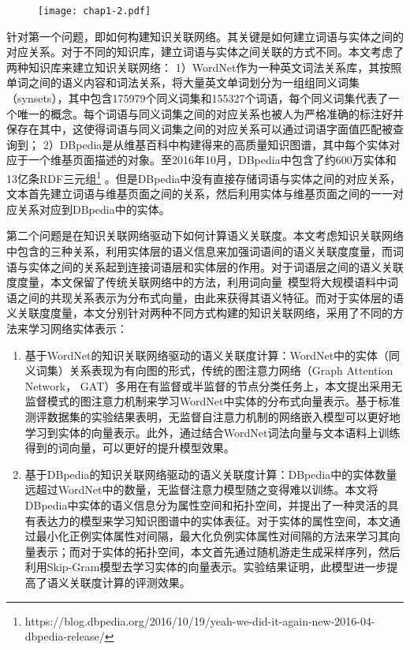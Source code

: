 \begin{figure}
    \centerline{\texttt{[image: chap1-2.pdf]}}
    \label{chap1-2}
\end{figure}

针对第一个问题，即如何构建知识关联网络。其关键是如何建立词语与实体之间的对应关系。对于不同的知识库，建立词语与实体之间关联的方式不同。本文考虑了两种知识库来建立知识关联网络：
1）WordNet作为一种英文词法关系库，其按照单词之间的语义内容和词法关系，将大量英文单词划分为一组组同义词集（synsets），其中包含175979个同义词集和155327个词语，每个同义词集代表了一个唯一的概念。每个词语与同义词集之间的对应关系也被人为严格准确的标注好并保存在其中，这使得词语与同义词集之间的对应关系可以通过词语字面值匹配被查询到；
2）DBpedia是从维基百科中构建得来的高质量知识图谱，其中每个实体对应于一个维基页面描述的对象。至2016年10月，DBpedia中包含了约600万实体和13亿条RDF三元组\footnote{https://blog.dbpedia.org/2016/10/19/yeah-we-did-it-again-new-2016-04-dbpedia-release/} 。但是DBpedia中没有直接存储词语与实体之间的对应关系，文本首先建立词语与维基页面之间的关系，然后利用实体与维基页面之间的一一对应关系对应到DBpedia中的实体。

第二个问题是在知识关联网络驱动下如何计算语义关联度。本文考虑知识关联网络中包含的三种关系，利用实体层的语义信息来加强词语间的语义关联度度量，而词语与实体之间的关系起到连接词语层和实体层的作用。对于词语层之间的语义关联度度量，本文保留了传统关联网络中的方法，利用词向量~\cite{corr/Mikolov13, emnlp/PenningtonSM14}模型将大规模语料中词语之间的共现关系表示为分布式向量，由此来获得其语义特征。而对于实体层的语义关联度度量，本文分别针对两种不同方式构建的知识关联网络，采用了不同的方法来学习网络实体表示：
\begin{enumerate}
    \item 基于WordNet的知识关联网络驱动的语义关联度计算：WordNet中的实体（同义词集）关系表现为有向图的形式，传统的图注意力网络（Graph Attention Network， GAT）\cite{iclr/VelickovicCCRLB18}多用在有监督或半监督的节点分类任务上，本文提出采用无监督模式的图注意力机制来学习WordNet中实体的分布式向量表示。基于标准测评数据集的实验结果表明，无监督自注意力机制的网络嵌入模型可以更好地学习到实体的向量表示。此外，通过结合WordNet词法向量与文本语料上训练得到的词向量，可以更好的提升模型效果。
    \item 基于DBpedia的知识关联网络驱动的语义关联度计算：DBpedia中的实体数量远超过WordNet中的数量，无监督注意力模型随之变得难以训练。本文将DBpedia中实体的语义信息分为属性空间和拓扑空间，并提出了一种灵活的具有表达力的模型来学习知识图谱中的实体表征。对于实体的属性空间，本文通过最小化正例实体属性对间隔，最大化负例实体属性对间隔的方法来学习其向量表示；而对于实体的拓扑空间，本文首先通过随机游走生成采样序列，然后利用Skip-Gram\cite{corr/Mikolov13}模型去学习实体的向量表示。实验结果证明，此模型进一步提高了语义关联度计算的评测效果。
\end{enumerate}

